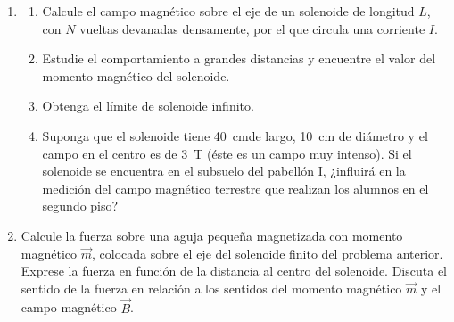 \documentclass[11pt,spanish,a4paper]{article}
\begin{document}
\begin{enumerate}
  \item \setlength{\parskip}{0cm}
\begin{enumerate}
  \item Calcule el campo magnético sobre el eje de un solenoide de longitud \(L\), con \(N\) vueltas devanadas densamente, por el que circula una corriente \(I\). 
  \item Estudie el comportamiento a grandes distancias y encuentre el valor del momento
magnético del solenoide.
  \item Obtenga el límite de solenoide infinito.
  \item Suponga que el solenoide tiene \SI{40}{\centi\metre}de largo, \SI{10}{\centi\metre} de diámetro y el campo en el centro es de \SI{3}{\tesla} (éste es un campo muy intenso).
Si el solenoide se encuentra en el subsuelo del pabellón I, ¿influirá en la medición del campo magnético terrestre que realizan los alumnos en el segundo piso?
\end{enumerate}


  \item Calcule la fuerza sobre una aguja pequeña magnetizada con momento magnético \(\vec{m}\), colocada sobre el eje del solenoide finito del problema anterior.
Exprese la fuerza en función de la distancia al centro del solenoide.
Discuta el sentido de la fuerza en relación a los sentidos del momento magnético \(\vec{m}\) y el campo magnético \(\vec{B}\).




\end{enumerate}
\end{document}
